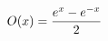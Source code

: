 \documentclass[preview]{standalone}
\begin{document}
\begin{align*}
\special{dvisvgm:raw <g id='unique000'>}O(x)=\frac{e^x-e^{-x}}{2}\special{dvisvgm:raw </g>}
\end{align*}
\end{document}
